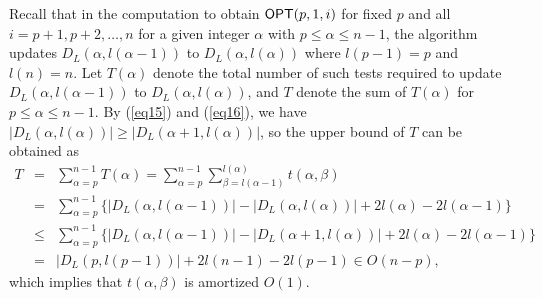 \documentclass[a4paper]{llncs}
\begin{document}
Recall that in the computation to obtain ${\sf OPT}(p, 1, i)$ for fixed $p$ and all $i=p+1, p+2, \ldots, n$
for a given integer $\alpha$ with $p \le \alpha \le n-1$, the algorithm updates $D_L(\alpha, l(\alpha-1))$ to $D_L(\alpha, l(\alpha))$ where $l(p-1)=p$ and $l(n) = n$.
Let $T(\alpha)$ denote the total number of such tests required to update $D_L(\alpha, l(\alpha-1))$ to $D_L(\alpha, l(\alpha))$,
and $T$ denote the sum of $T(\alpha)$ for $p \le \alpha \le n-1$.
By (\ref{eq15}) and (\ref{eq16}), we have $|D_L(\alpha, l(\alpha))| \ge |D_L(\alpha+1, l(\alpha))|$, so the upper bound of $T$ can be obtained as
\begin{eqnarray}
T 	&=&		\sum_{\alpha=p}^{n-1} T(\alpha)	=	\sum_{\alpha=p}^{n-1} \sum_{\beta=l(\alpha-1)}^{l(\alpha)} t(\alpha, \beta) \nonumber \\
 	&=&		\sum_{\alpha=p}^{n-1} \big\{ |D_L(\alpha, l(\alpha-1))| - |D_L(\alpha, l(\alpha))| + 2l(\alpha) - 2l(\alpha-1) \big\} \nonumber \\
	&\le&	\sum_{\alpha=p}^{n-1} \big\{ |D_L(\alpha, l(\alpha-1))| - |D_L(\alpha+1, l(\alpha))| + 2l(\alpha) - 2l(\alpha-1) \big\} \nonumber \\
	&=&		|D_L(p, l(p-1))| + 2l(n-1) - 2l(p-1) \in O(n-p),
\label{eq19}
\end{eqnarray}
which implies that $t(\alpha, \beta)$ is amortized $O(1)$.
\end{document}
